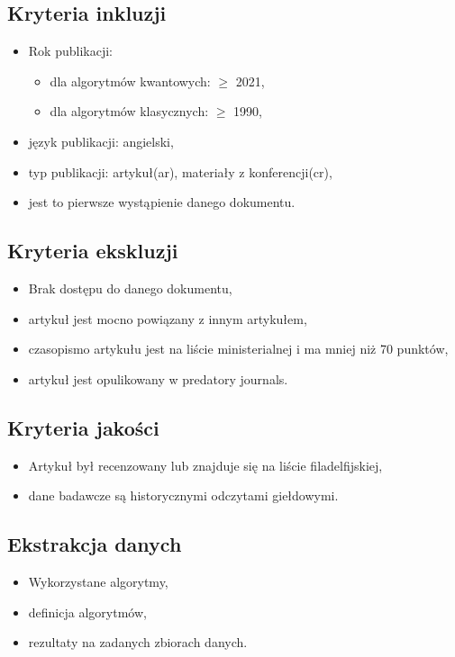 \documentclass[polish,envcountsect,10pt]{article}
\begin{document}
\subsection{Kryteria inkluzji}
\begin{itemize}
	\item Rok publikacji:
	      \begin{itemize}
		      \item dla algorytmów kwantowych: $\ge$ 2021,
		      \item dla algorytmów klasycznych: $\ge$ 1990,
	      \end{itemize}
	\item język publikacji: angielski,
	\item typ publikacji: artykuł(ar), materiały z konferencji(cr),
	\item jest to pierwsze wystąpienie danego dokumentu.
\end{itemize}

\subsection{Kryteria ekskluzji}

\begin{itemize}
	\item Brak dostępu do danego dokumentu,
	\item artykuł jest mocno powiązany z innym artykułem,
	\item czasopismo artykułu jest na liście ministerialnej i ma mniej niż 70 punktów,
	\item artykuł jest opulikowany w predatory journals.
\end{itemize}

\subsection{Kryteria jakości}

\begin{itemize}
	\item Artykuł był recenzowany lub znajduje się na liście filadelfijskiej,
	\item dane badawcze są historycznymi odczytami giełdowymi.
\end{itemize}

\subsection{Ekstrakcja danych}

\begin{itemize}
	\item Wykorzystane algorytmy,
	\item definicja algorytmów,
	\item rezultaty na zadanych zbiorach danych.
\end{itemize}
\end{document}
